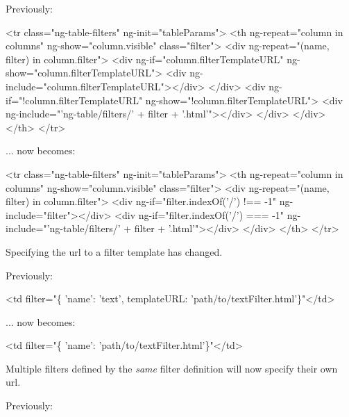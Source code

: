 Previously\+:


\begin{DoxyCode}
<tr class="ng-table-filters" ng-init="tableParams">
    <th ng-repeat="column in columns" ng-show="column.visible" class="filter">
        <div ng-repeat="(name, filter) in column.filter">
            <div ng-if="column.filterTemplateURL" ng-show="column.filterTemplateURL">
                <div ng-include="column.filterTemplateURL"></div>
            </div>
            <div ng-if="!column.filterTemplateURL" ng-show="!column.filterTemplateURL">
                <div ng-include="'ng-table/filters/' + filter + '.html'"></div>
            </div>
        </div>
    </th>
</tr>
\end{DoxyCode}
 ... now becomes\+:


\begin{DoxyCode}
<tr class="ng-table-filters" ng-init="tableParams">
    <th ng-repeat="column in columns" ng-show="column.visible" class="filter">
        <div ng-repeat="(name, filter) in column.filter">
            <div ng-if="filter.indexOf('/') !== -1" ng-include="filter"></div>
            <div ng-if="filter.indexOf('/') === -1" ng-include="'ng-table/filters/' + filter +
       '.html'"></div>
        </div>
    </th>
</tr>
\end{DoxyCode}



\begin{DoxyItemize}
\item Specifying the url to a filter template has changed.
\end{DoxyItemize}

Previously\+:


\begin{DoxyCode}
<td filter="\{ 'name': 'text', templateURL: 'path/to/textFilter.html'\}"</td>
\end{DoxyCode}


... now becomes\+:


\begin{DoxyCode}
<td filter="\{ 'name': 'path/to/textFilter.html'\}"</td>
\end{DoxyCode}



\begin{DoxyItemize}
\item Multiple filters defined by the {\itshape same} filter definition will now specify their own url.
\end{DoxyItemize}

Previously\+:



